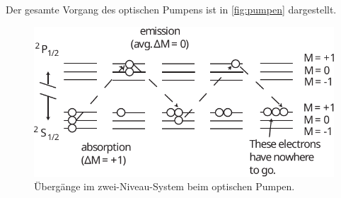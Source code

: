     Der gesamte Vorgang des optischen Pumpens ist in \autoref{fig:pumpen} dargestellt.
    \begin{figure}
        \centering
        \includegraphics[scale=0.8]{content/img/Lit2_Abb_8.pdf}
        \caption{Übergänge im zwei-Niveau-System beim optischen Pumpen. \cite{caltech}}
        \label{fig:pumpen}
    \end{figure}










